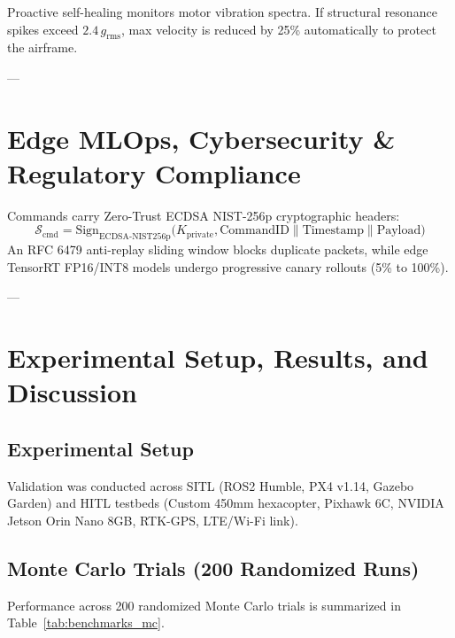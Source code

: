 \documentclass[pdflatex,sn-mathphys-num]{sn-jnl}%
\theoremstyle{thmstyleone}%
\theoremstyle{thmstyletwo}%
\theoremstyle{thmstylethree}%
\begin{document}
Proactive self-healing monitors motor vibration spectra. If structural resonance spikes exceed $2.4\,g_{\text{rms}}$, max velocity is reduced by 25\% automatically to protect the airframe.

---

\section{Edge MLOps, Cybersecurity \& Regulatory Compliance}\label{sec:security}

Commands carry Zero-Trust ECDSA NIST-256p cryptographic headers:
\begin{equation}
\mathcal{S}_{\text{cmd}} = \text{Sign}_{\text{ECDSA-NIST256p}}\Big(K_{\text{private}}, \text{CommandID} \parallel \text{Timestamp} \parallel \text{Payload}\Big)
\label{eq:ecdsa}
\end{equation}
An RFC 6479 anti-replay sliding window blocks duplicate packets, while edge TensorRT FP16/INT8 models undergo progressive canary rollouts (5\% to 100\%).

---

\section{Experimental Setup, Results, and Discussion}\label{sec:experiments}

\subsection{Experimental Setup}
Validation was conducted across SITL (ROS2 Humble, PX4 v1.14, Gazebo Garden) and HITL testbeds (Custom 450mm hexacopter, Pixhawk 6C, NVIDIA Jetson Orin Nano 8GB, RTK-GPS, LTE/Wi-Fi link).

\subsection{Monte Carlo Trials (200 Randomized Runs)}
Performance across 200 randomized Monte Carlo trials is summarized in Table~\ref{tab:benchmarks_mc}.
\end{document}
